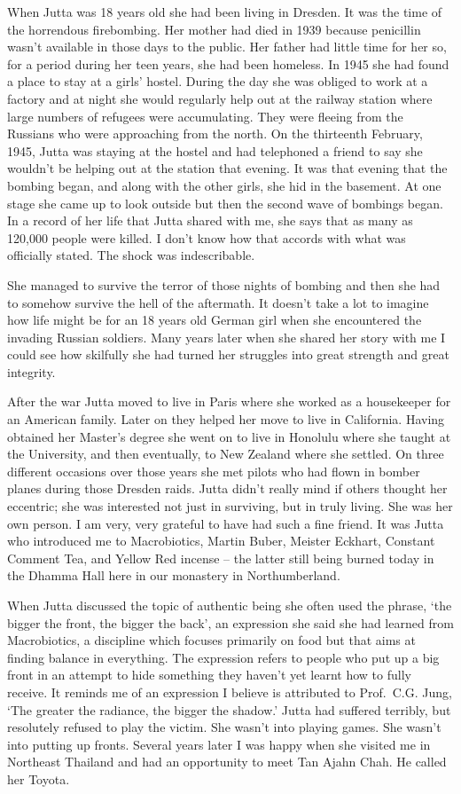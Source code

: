When Jutta was 18 years old she had been living in Dresden. It was the
time of the horrendous firebombing\cite{firebombing}.
Her mother had died in 1939 because penicillin wasn't
available in those days to the public. Her father had little time for
her so, for a period during her teen years, she had been homeless. In
1945 she had found a place to stay at a girls' hostel. During the day
she was obliged to work at a factory and at night she would regularly
help out at the railway station where large numbers of refugees were
accumulating. They were fleeing from the Russians who were approaching
from the north. On the thirteenth February, 1945, Jutta was staying at
the hostel and had telephoned a friend to say she wouldn't be helping
out at the station that evening. It was that evening that the bombing
began, and along with the other girls, she hid in the basement. At one
stage she came up to look outside but then the second wave of bombings
began. In a record of her life that Jutta shared with me, she says that
as many as 120,000 people were killed. I don't know how that accords
with what was officially stated. The shock was indescribable.

She managed to survive the terror of those nights of bombing and then
she had to somehow survive the hell of the aftermath. It doesn't take a
lot to imagine how life might be for an 18 years old German girl when
she encountered the invading Russian soldiers. Many years later when she
shared her story with me I could see how skilfully she had turned her
struggles into great strength and great integrity.

After the war Jutta moved to live in Paris where she worked as a
housekeeper for an American family. Later on they helped her move to
live in California. Having obtained her Master's degree she went on to
live in Honolulu where she taught at the University, and then
eventually, to New Zealand where she settled. On three different
occasions over those years she met pilots who had flown in bomber planes
during those Dresden raids. Jutta didn't really mind if others thought
her eccentric; she was interested not just in surviving, but in truly
living. She was her own person. I am very, very grateful to have had
such a fine friend. It was Jutta who introduced me to Macrobiotics,
Martin Buber, Meister Eckhart, Constant Comment Tea, and Yellow Red
incense -- the latter still being burned today in the Dhamma Hall here
in our monastery in Northumberland.

When Jutta discussed the topic of authentic being she often used the
phrase, `the bigger the front, the bigger the back', an expression she
said she had learned from Macrobiotics, a discipline which focuses
primarily on food but that aims at finding balance in everything. The
expression refers to people who put up a big front in an attempt to hide
something they haven't yet learnt how to fully receive. It reminds me of
an expression I believe is attributed to Prof.~C.G. Jung, `The greater
the radiance, the bigger the shadow.' Jutta had suffered terribly, but
resolutely refused to play the victim. She wasn't into playing games.
She wasn't into putting up fronts. Several years later I was happy when
she visited me in Northeast Thailand and had an opportunity to meet Tan
Ajahn Chah. He called her Toyota.

